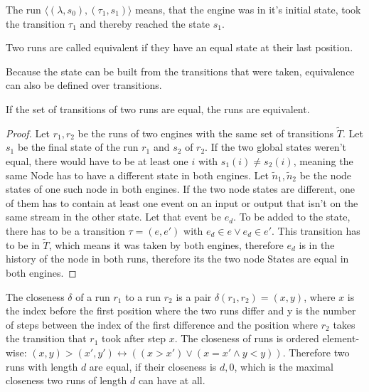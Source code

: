 The run \(\langle (\lambda, s_0), (\tau_1, s_1) \rangle\) means, that the engine was in it's initial state, took the transition \(\tau_1\) and thereby reached the state \(s_1\).

\begin{definition}[name = Equivalence of Runs]\label{def:equivalence_runs}
  Two runs are called equivalent if they have an equal state at their last position.
\end{definition}

Because the state can be built from the transitions that were taken, equivalence can also be defined over transitions.

\begin{lemma}[name = Equivalence of Runs over Transitions]\label{lemma:equivalent_runs_with_transitions}
  If the set of transitions of two runs are equal, the runs are equivalent.
\end{lemma}

\begin{proof}
  Let \(r_1, r_2\) be the runs of two engines with the same set of transitions \(\widetilde{T}\).
  Let \(s_1\) be the final state of the run \(r_1\) and \(s_2\) of \(r_2\).
  If the two global states weren't equal, there would have to be at least one \(i\) with \(s_1(i) \neq s_2(i)\), meaning the same Node has to have a different state in both engines.
  Let \(\widetilde{n}_1, \widetilde{n}_2\) be the node states of one such node in both engines.
  If the two node states are different, one of them has to contain at least one event on an input or output that isn't on the same stream in the other state.
  Let that event be \(e_d\).
  To be added to the state, there has to be a transition \(\tau = (e, e')\) with \(e_d \in e \lor e_d \in e'\).
  This transition has to be in \(\widetilde{T}\), which means it was taken by both engines, therefore \(e_d\) is in the history of the node in both runs, therefore its the two node States are equal in both engines.
\end{proof}

\begin{definition}[name = Closeness of Runs]\label{def:runs_closeness}
  The closeness \(\delta\) of a run \(r_1\) to a run \(r_2\) is a pair \(\delta(r_1,r_2) = (x,y)\), where \(x\) is the index before the first position where the two runs differ and y is the number of steps between the index of the first difference and the position where \(r_2\) takes the transition that \(r_1\) took after step \(x\).
  The closeness of runs is ordered element-wise: \((x,y) > (x',y') \leftrightarrow ((x > x') \lor (x = x' \land y < y))\).
  Therefore two runs with length \(d\) are equal, if their closeness is \(d,0\), which is the maximal closeness two runs of length \(d\) can have at all.
\end{definition}

